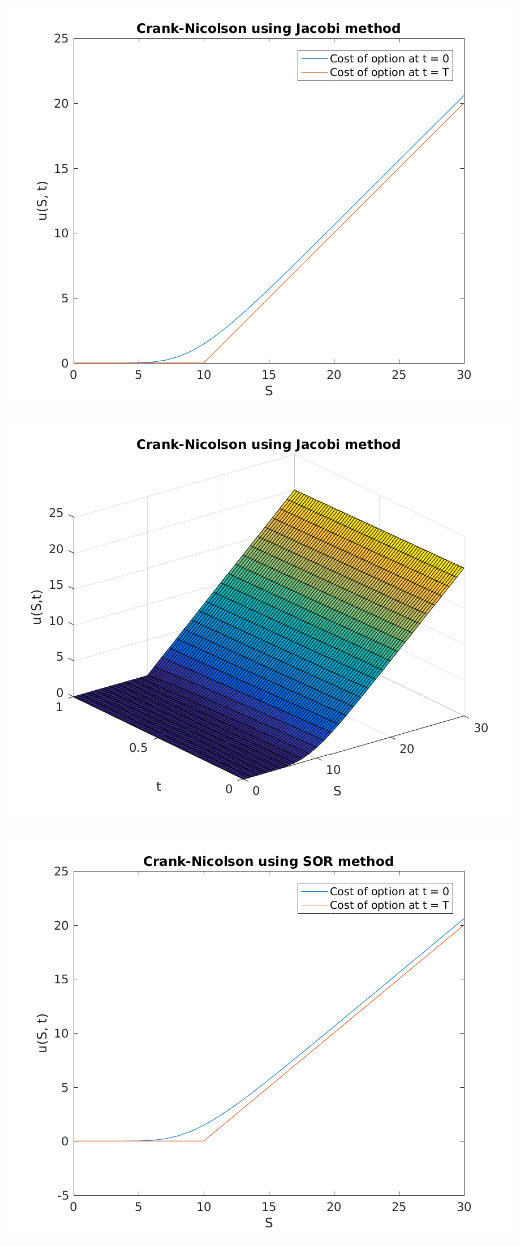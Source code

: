 \documentclass{article}
\begin{document}
\includegraphics{"q1_15"}
\pagebreak


\includegraphics{"q1_16"}
\pagebreak


\includegraphics{"q1_17"}
\pagebreak
\end{document}
